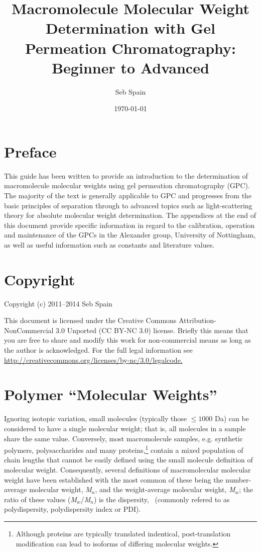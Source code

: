 \documentclass[11pt]{article}
\author{Seb Spain}
\date{\today}
\title{Macromolecule Molecular Weight Determination with Gel Permeation Chromatography: Beginner to Advanced}
\newcommand{\Mn}{\emph{M}$_n$}
\newcommand{\Mw}{\emph{M}$_w$}
\begin{document}
\maketitle
\thispagestyle{empty}
\newpage


\setcounter{page}{1}
\tableofcontents
\newpage
{}
\listoffigures
\newpage
{}
\section*{Preface}
This guide has been written to provide an introduction to the determination of macromolecule molecular weights using gel permeation chromatography (GPC). The majority of the text is generally applicable to GPC and progresses from the basic principles of separation through to advanced topics such as light-scattering theory for absolute molecular weight determination. The appendices at the end of this document provide specific information in regard to the calibration, operation and maintenance of the GPCs in the Alexander group, University of Nottingham, as well as useful information such as constants and literature values.
\section*{Copyright}
Copyright (c) 2011--2014 Seb Spain

This document is licensed under the Creative Commons Attribution-NonCommercial 3.0 Unported (CC BY-NC 3.0) license. Briefly this means that you are free to share and modify this work for non-commercial means as long as the author is acknowledged. For the full legal information see \href{http://creativecommons.org/licenses/by-nc/3.0/legalcode}{http://creativecommons.org/licenses/by-nc/3.0/legalcode.}

\newpage
{}
\setcounter{page}{1}

\section{Polymer ``Molecular Weights''}
Ignoring isotopic variation, small molecules (typically those $\leq1000$ Da) can be considered to have a single molecular weight; that is, all molecules in a sample share the same value.
Conversely, most macromolecule samples, e.g. synthetic polymers, polysaccharides and many proteins,\footnote{Although proteins are typically translated indentical, post-translation modification can lead to isoforms of differing molecular weights.} contain a mixed population of chain lengths that cannot be easily defined using the small molecule definition of molecular weight.
Consequently, several definitions of macromolecular molecular weight have been established with the most common of these being the number-average molecular weight, \Mn, and the weight-average molecular weight, \Mw; the ratio of these values (\Mw/\Mn) is the dispersity, \DJ\ (commonly refered to as polydispersity, polydispersity index or PDI). 
\end{document}
